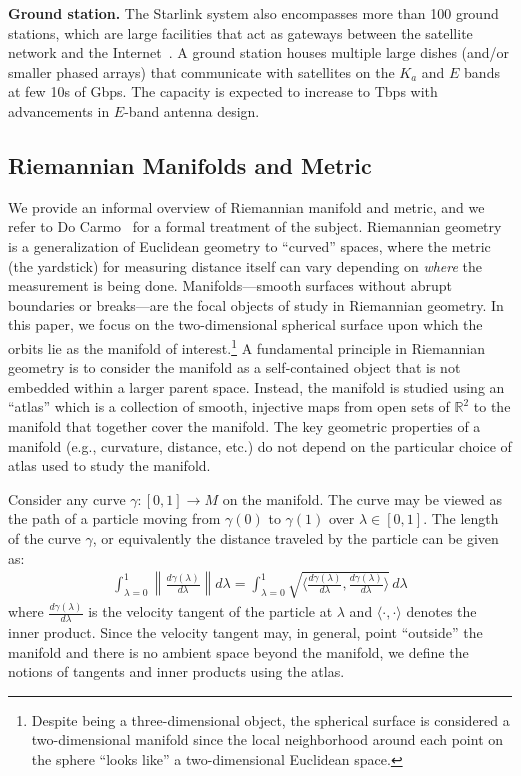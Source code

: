 \documentclass[acmsmall, screen]{acmart}
\begin{document}
\smallskip 
\noindent 
{\bf Ground station.} The Starlink system also encompasses more than 100 ground stations, which are large facilities that act as gateways between the satellite network and the Internet~\cite{starlinknetupdate}. A ground station houses multiple large dishes (and/or smaller phased arrays) that communicate with satellites on the $K_a$ and $E$ bands at few 10s of Gbps. The capacity is expected to increase to Tbps with advancements in $E$-band antenna design.

\subsection{Riemannian Manifolds and Metric}\label{background:riemannian}
We provide an informal overview of Riemannian manifold and metric, and we refer to Do Carmo~\cite{do1992riemannian} for a formal treatment of the subject. Riemannian geometry is a generalization of Euclidean geometry to ``curved'' spaces, where the metric (the yardstick) for measuring distance itself can vary depending on {\em where} the measurement is being done. Manifolds---smooth surfaces without abrupt boundaries or breaks---are the focal objects of study in Riemannian geometry. In this paper, we focus on the two-dimensional spherical surface upon which the orbits lie as the manifold of interest.\footnote{Despite being a three-dimensional object, the spherical surface is considered a two-dimensional manifold since the local neighborhood around each point on the sphere ``looks like'' a two-dimensional Euclidean space.} A fundamental principle in Riemannian geometry is to consider the manifold as a self-contained object that is not embedded within a larger parent space. Instead, the manifold is studied using an ``atlas'' which is a collection of smooth, injective maps from open sets of $\mathbb{R}^2$ to the manifold that together cover the manifold. The key geometric properties of a manifold (e.g., curvature, distance, etc.) do not depend on the particular choice of atlas used to study the manifold.  

Consider any curve $\gamma: [0, 1] \rightarrow M$ on the manifold. 
The curve may be viewed as the path of a particle moving from $\gamma(0)$ to $\gamma(1)$ over $\lambda \in [0,1]$. The length of the curve $\gamma$, or equivalently the distance traveled by the particle can be given as: 
\begin{align}
\int_{\lambda=0}^1 \left\lVert  \frac{d\gamma(\lambda)}{d\lambda} \right\rVert d\lambda = \int_{\lambda=0}^1 \sqrt{ \langle \frac{d\gamma(\lambda)}{d\lambda}, \frac{d\gamma(\lambda)}{d\lambda} \rangle } \, d\lambda  
\end{align}
where $\frac{d\gamma(\lambda)}{d\lambda}$ is the velocity tangent of the particle at $\lambda$ and $\langle \cdot, \cdot \rangle$ denotes the inner product. Since the velocity tangent may, in general, point “outside” the manifold and there is no ambient space beyond the manifold, we define the notions of tangents and inner products using the atlas. 
\end{document}
